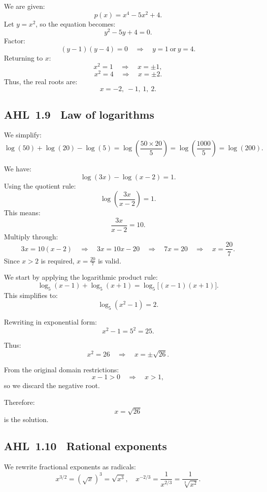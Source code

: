\documentclass[11pt]{article}
\newcommand{\tocsubsection}[1]{\subsection{#1}}
\begin{document}
\begin{solution}
We are given:
\[
p(x) = x^{4} - 5x^{2} + 4.
\]
Let \( y = x^2 \), so the equation becomes:
\[
y^2 - 5y + 4 = 0.
\]
Factor:
\[
(y - 1)(y - 4) = 0 \quad \Rightarrow \quad y = 1 \ \text{or} \ y = 4.
\]
Returning to \( x \):
\[
x^2 = 1 \quad \Rightarrow \quad x = \pm 1,
\]
\[
x^2 = 4 \quad \Rightarrow \quad x = \pm 2.
\]
Thus, the real roots are:
\[
x = -2, \ -1, \ 1, \ 2.
\]
\end{solution}


\tocsubsection{AHL 1.9 \; Law of logarithms}

\begin{solution}
We simplify:
\[
\log(50) + \log(20) - \log(5) = \log\left(\frac{50 \times 20}{5}\right)
= \log\left(\frac{1000}{5}\right) = \log(200).
\]
\end{solution}


\begin{solution}
We have:
\[
\log(3x) - \log(x - 2) = 1.
\]
Using the quotient rule:
\[
\log\left(\frac{3x}{x - 2}\right) = 1.
\]
This means:
\[
\frac{3x}{x - 2} = 10.
\]
Multiply through:
\[
3x = 10(x - 2) \quad \Rightarrow \quad 3x = 10x - 20 \quad \Rightarrow \quad 7x = 20 \quad \Rightarrow \quad x = \frac{20}{7}.
\]
Since \(x > 2\) is required, \(x = \frac{20}{7}\) is valid.
\end{solution}


\begin{solution}
We start by applying the logarithmic product rule:
\[
\log_5(x - 1) + \log_5(x + 1) = \log_5\big[(x - 1)(x + 1)\big].
\]
This simplifies to:
\[
\log_5(x^2 - 1) = 2.
\]

Rewriting in exponential form:
\[
x^2 - 1 = 5^2 = 25.
\]

Thus:
\[
x^2 = 26 \quad\Rightarrow\quad x = \pm\sqrt{26}.
\]

From the original domain restrictions:
\[
x - 1 > 0 \quad\Rightarrow\quad x > 1,
\]
so we discard the negative root.

Therefore:
\[
\boxed{x = \sqrt{26}}
\]
is the solution.
\end{solution}


\tocsubsection{AHL 1.10 \; Rational exponents}

\begin{solution}
We rewrite fractional exponents as radicals:
\[
x^{3/2} = \left( \sqrt{x} \right)^3 = \sqrt{x^3}, 
\quad
x^{-2/3} = \frac{1}{x^{2/3}} = \frac{1}{\sqrt[3]{x^2}}.
\]
\end{solution}
\end{document}
